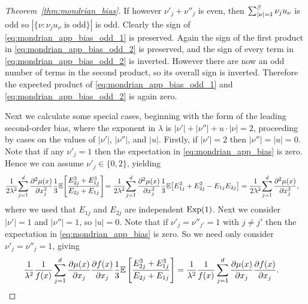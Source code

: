 \begin{proof}[Theorem~\ref{thm:mondrian_bias}]
  If however $\nu'_j + \nu''_j$ is even, then
  $\sum_{|\nu|=1}^{\flbeta} \nu_j u_\nu$ is odd so
  $|\{\nu : \nu_j u_\nu \text{ is odd}\}|$ is odd.
  Clearly the sign of \eqref{eq:mondrian_app_bias_odd_1} is preserved.
  Again the sign of the first product in \eqref{eq:mondrian_app_bias_odd_2}
  is preserved, and the sign of every term in \eqref{eq:mondrian_app_bias_odd_2}
  is inverted. However there are now an odd number of terms in the
  second product, so its overall sign is inverted.
  Therefore the expected product
  of \eqref{eq:mondrian_app_bias_odd_1} and \eqref{eq:mondrian_app_bias_odd_2}
  is again zero.


  Next we calculate some special cases, beginning with
  the form of the leading second-order bias,
  where the exponent in $\lambda$ is
  $|\nu'| + |\nu''| + u \cdot |\nu| = 2$,
  proceeding by cases on the values of $|\nu'|$, $|\nu''|$, and $|u|$.
  Firstly, if $|\nu'| = 2$ then $|\nu''| = |u| = 0$.
  Note that if any $\nu'_j = 1$ then the expectation in
  \eqref{eq:mondrian_app_bias} is zero.
  Hence we can assume $\nu'_j \in \{0, 2\}$, yielding
  \begin{align*}
    \frac{1}{2 \lambda^2}
    \! \sum_{j=1}^d
    \frac{\partial^2 \mu(x)}{\partial x_j^2}
    \frac{1}{3}
    \mathbb{E} \! \left[
      \frac{E_{2j}^{3} + E_{1j}^{3}} {E_{2j} + E_{1j}}
    \right]
    &\!=
    \frac{1}{2 \lambda^2}
    \! \sum_{j=1}^d
    \frac{\partial^2 \mu(x)}{\partial x_j^2}
    \frac{1}{3}
    \mathbb{E} \! \left[
      E_{1j}^{2}
      + E_{2j}^{2}
      - E_{1j} E_{2j}
    \right]
    = \frac{1}{2 \lambda^2}
    \! \sum_{j=1}^d
    \frac{\partial^2 \mu(x)}{\partial x_j^2},
  \end{align*}
  where we used that $E_{1j}$ and $E_{2j}$ are independent $\operatorname{Exp}(1)$.
  Next we consider $|\nu'| = 1$ and $|\nu''| = 1$, so $|u| = 0$.
  Note that if $\nu'_j = \nu''_{j'} = 1$ with $j \neq j'$ then the
  expectation in \eqref{eq:mondrian_app_bias} is zero.
  So we need only consider $\nu'_j = \nu''_j = 1$, giving
  \begin{align*}
    \frac{1}{\lambda^2}
    \frac{1}{f(x)}
    \sum_{j=1}^{d}
    \frac{\partial \mu(x)}{\partial x_j}
    \frac{\partial f(x)}{\partial x_j}
    \frac{1}{3}
    \mathbb{E} \left[
      \frac{E_{2j}^{3} + E_{1j}^{3}}
      {E_{2j} + E_{1j}}
    \right]
    &=
    \frac{1}{\lambda^2}
    \frac{1}{f(x)}
    \sum_{j=1}^{d}
    \frac{\partial \mu(x)}{\partial x_j}
    \frac{\partial f(x)}{\partial x_j}.
  \end{align*}

\end{proof}
